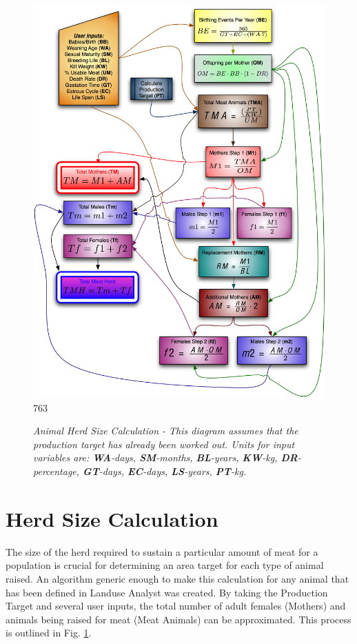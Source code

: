 \begin{figure}[htbp]
    \includegraphics[scale=.4]{./images/animalHerdSize.jpg}
763
    \caption[Animal Herd Size Calculation]{\label{fig:herdSize}\textit{Animal
Herd Size Calculation - This diagram assumes that the production target has
already been worked out.  Units for input variables are: \textbf{WA}-days,
\textbf{SM}-months, \textbf{BL}-years, \textbf{KW}-kg, \textbf{DR}-percentage,
\textbf{GT}-days, \textbf{EC}-days, \textbf{LS}-years, \textbf{PT}-kg.}}
\end{figure}

\section{Herd Size Calculation}
The size of the herd required to sustain a particular amount of meat for a
population is crucial for determining an area target for each type of animal
raised.  An algorithm generic enough to make this calculation for any animal
that has been defined in Landuse Analyst was created. By taking the Production
Target and several user inputs, the total number of adult females (Mothers) and
animals being raised for meat (Meat Animals) can be approximated. This process
is outlined in Fig. \ref{fig:herdSize}.

